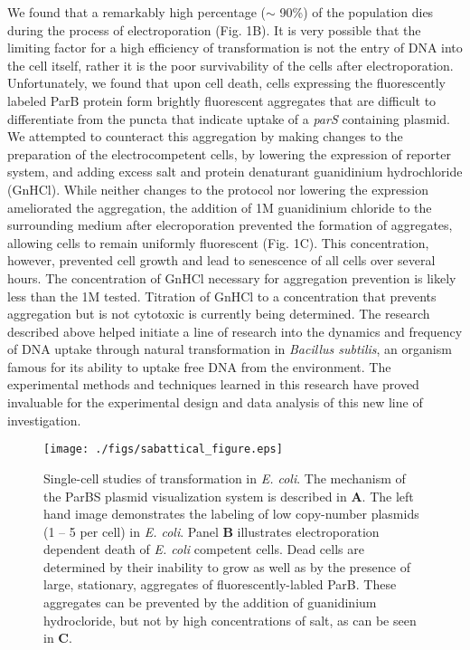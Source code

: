 \documentclass[letterpaper, 12pt]{article}
\begin{document}
We found that a remarkably high percentage ($\sim$ 90\%) of the population dies
during the process of electroporation (Fig. 1B). It is very possible that the
limiting factor for a high efficiency of transformation is not the entry of DNA
into the cell itself, rather it is the poor survivability of the cells after
electroporation. Unfortunately, we found that upon cell death, cells expressing
the fluorescently labeled ParB protein form brightly fluorescent aggregates that
are difficult to differentiate from the puncta that indicate uptake of a
\textit{parS} containing plasmid. We attempted to counteract this aggregation by
making changes to the preparation of the electrocompetent cells, by lowering the
expression of reporter system, and adding excess salt and protein denaturant
guanidinium hydrochloride (GnHCl). While neither changes to the protocol nor
lowering the expression ameliorated the aggregation, the addition of 1M
guanidinium chloride to the surrounding medium after elecroporation prevented
the formation of aggregates, allowing cells to remain uniformly fluorescent
(Fig. 1C).  This concentration, however, prevented cell growth and lead to
senescence of all cells over several hours.  The concentration of GnHCl
necessary for aggregation prevention is likely less than the 1M tested.
Titration of GnHCl to a concentration that prevents aggregation but is not
cytotoxic is currently being determined. The research described above helped
initiate a line of research into the dynamics and frequency of DNA uptake
through natural transformation in \textit{Bacillus subtilis}, an organism famous
for its ability to uptake free DNA from the environment. The experimental methods
and techniques learned in this research have proved invaluable for the
experimental design and data analysis of this new line of investigation.


\begin{figure}
	\centerline{
		\texttt{[image: ./figs/sabattical\_figure.eps]}
	}
	\caption{\small Single-cell studies of transformation in
		\textit{E. coli}. The mechanism of the ParBS plasmid
		visualization system is described in \textbf{A}. The left hand
		image demonstrates the labeling of low copy-number plasmids
		(1 -- 5 per cell) in \textit{E. coli}. Panel \textbf{B}
		illustrates electroporation dependent death of \textit{E. coli}
		competent cells. Dead cells are determined by their inability to
		grow as well as by the presence of large, stationary, aggregates
		of fluorescently-labled ParB. These aggregates can be prevented
		by the addition of guanidinium hydrocloride, but not by high
		concentrations of salt, as can be seen in \textbf{C}.}
	\end{figure}
\end{document}
